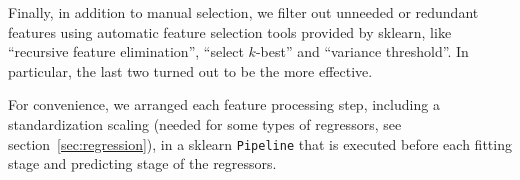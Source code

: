 Finally, in addition to manual selection, we filter out unneeded or redundant features using automatic feature selection tools provided by sklearn, like ``recursive feature elimination'', ``select $k$-best'' and ``variance threshold''. In particular, the last two turned out to be the more effective.

For convenience, we arranged each feature processing step, including a standardization scaling (needed for some types of regressors, see section~\ref{sec:regression}), in a sklearn \texttt{Pipeline} that is executed before each fitting stage and predicting stage of the regressors.
